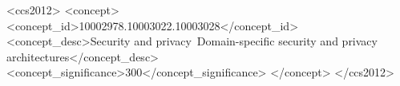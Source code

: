 \documentclass[sigconf]{acmart}
\begin{document}



\begin{CCSXML}
<ccs2012>
   <concept>
       <concept_id>10002978.10003022.10003028</concept_id>
       <concept_desc>Security and privacy~Domain-specific security and privacy architectures</concept_desc>
       <concept_significance>300</concept_significance>
       </concept>
 </ccs2012>
\end{CCSXML}
\end{document}
